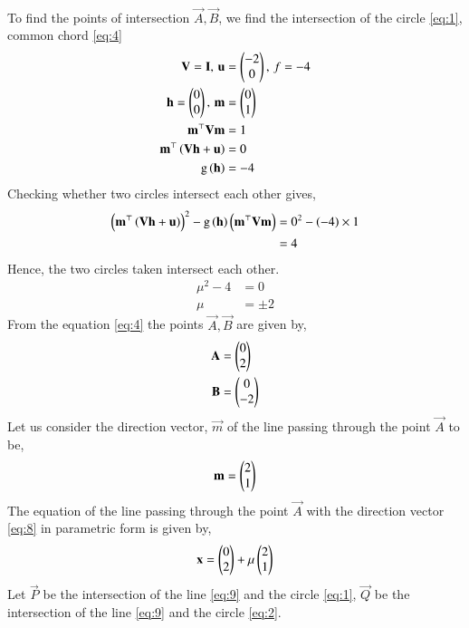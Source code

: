 \documentclass[journal,12pt,twocolumn]{IEEEtran}
\begin{document}
\begin{enumerate}
\begin{align}
\end{align}
To find the points of intersection $\vec{A}, \vec{B}$, we find the intersection of the circle \eqref{eq:1}, common chord \eqref{eq:4}
\begin{align}
\mathbf{V} = \mathbf{I}, \, \mathbf{u} &= \begin{pmatrix}-2\\0\end{pmatrix}, \, f = -4\\
\mathbf{h} = \begin{pmatrix}0\\0\end{pmatrix}, \, \mathbf{m} &= \begin{pmatrix}0\\1\end{pmatrix}\\
\mathbf{m}^{\top}\mathbf{V}\mathbf{m} &= 1\\
\mathbf{m}^{\top}\left(\mathbf{V}\mathbf{h}+\mathbf{u}\right) &= 0\\
\text{g}\left(\mathbf{h}\right) &= -4
\end{align}
Checking whether two circles intersect each other gives,
\begin{align}
{\ensuremath{\left(\mathbf{m}^{\top}\left(\mathbf{V}\mathbf{h}+\mathbf{u}\right)\right)}}^2-\text{g}\left(\mathbf{h}\right)\left(\mathbf{m}^{\top}\mathbf{V}\mathbf{m}\right) &= 0^2 - \left(-4\right)\times1\\
&= 4
\end{align}
Hence, the two circles taken intersect each other.
\begin{align}
\mu^2 - 4 &=0\\
\mu &= \pm 2
\end{align}
From the equation \eqref{eq:4} the points $\vec{A},\vec{B}$ are given by,
\begin{align}
\mathbf{A} &= \begin{pmatrix}0\\2\end{pmatrix}\\
\mathbf{B} &= \begin{pmatrix}0\\-2\end{pmatrix} 
\end{align} 
Let us consider the direction vector, $\vec{m}$ of the line passing through the point $\vec{A}$ to be,
\begin{align}
\mathbf{m} = \begin{pmatrix}2\\1\end{pmatrix}
\label{eq:8}
\end{align} 
The equation of the line passing through the point $\vec{A}$ with the direction vector \eqref{eq:8} in parametric form is given by,
\begin{align}
\mathbf{x} = \begin{pmatrix}0\\2\end{pmatrix} + \mu \begin{pmatrix}2\\1\end{pmatrix}
\label{eq:9}
\end{align}
Let $\vec{P}$ be the intersection of the line \eqref{eq:9} and the circle \eqref{eq:1}, $\vec{Q}$ be the intersection of the line \eqref{eq:9} and the circle \eqref{eq:2}. 


\end{enumerate}
\end{document}
